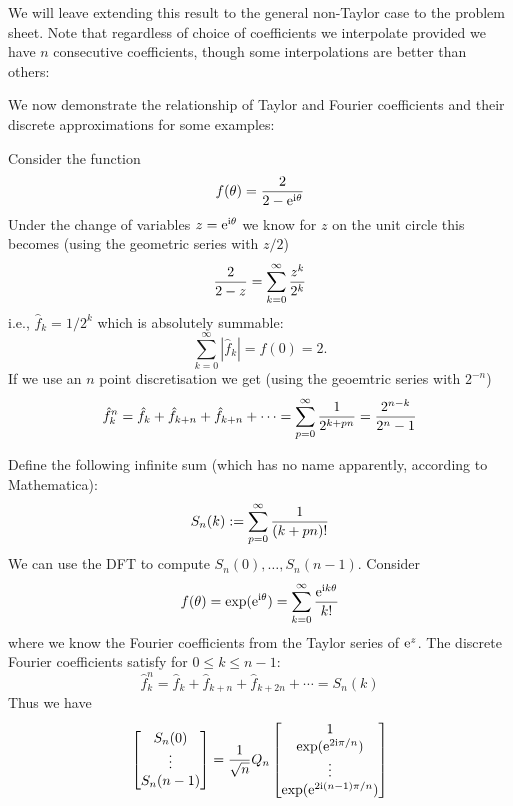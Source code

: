 We will leave extending this result to the general non-Taylor case to the problem sheet. Note that regardless of choice of coefficients we interpolate provided we have $n$ consecutive coefficients, though some interpolations are better than others:

We now demonstrate the relationship of Taylor and Fourier coefficients and their discrete approximations for some examples:

\begin{example} Consider the function
\[
f(\ensuremath{\theta}) = {2 \over 2 - {\rm e}^{{\rm i} \ensuremath{\theta}}}
\]
Under the change of variables $z = {\rm e}^{{\rm i} \ensuremath{\theta}}$ we know for $z$ on the unit circle this becomes (using the geometric series with $z/2$)
\[
{2 \over 2-z} = \ensuremath{\sum}_{k=0}^\ensuremath{\infty} {z^k \over 2^k}
\]
i.e., $\hat f_k = 1/2^k$ which is absolutely summable:
\[
\ensuremath{\sum}_{k=0}^\ensuremath{\infty} |\hat f_k| = f(0) = 2.
\]
If we use an $n$ point discretisation we get (using the geoemtric series with $2^{-n}$)
\[
\hat f_k^n = \hat f_k + \hat f_{k+n} + \hat f_{k+n} + \ensuremath{\cdots} = \ensuremath{\sum}_{p=0}^\ensuremath{\infty} {1 \over 2^{k+pn}} = {2^{n-k} \over 2^n - 1}
\]
\end{example}

\begin{example} Define the following infinite sum (which has no name apparently, according to Mathematica):
\[
S_n(k) := \ensuremath{\sum}_{p=0}^\ensuremath{\infty} {1 \over (k+pn)!}
\]
We can use the DFT to compute $S_n(0), \ensuremath{\ldots}, S_n(n-1)$. Consider
\[
f(\ensuremath{\theta}) = \exp({\rm e}^{{\rm i} \ensuremath{\theta}}) = \ensuremath{\sum}_{k=0}^\ensuremath{\infty} {{\rm e}^{{\rm i} k \ensuremath{\theta}} \over k!}
\]
where we know the Fourier coefficients from the Taylor series of ${\rm e}^z$. The discrete Fourier coefficients satisfy for $0 \ensuremath{\leq} k \ensuremath{\leq} n-1$:
\[
\hat f_k^n = \hat f_k + \hat f_{k+n} + \hat f_{k+2n} + \ensuremath{\cdots} = S_n(k)
\]
Thus we have
\[
\begin{bmatrix}
S_n(0) \\
\ensuremath{\vdots} \\
S_n(n-1)
\end{bmatrix} = {1 \over \sqrt{n}} Q_n \begin{bmatrix} 1 \\
                                \exp({\rm e}^{2{\rm i} \ensuremath{\pi}/n}) \\
                                \ensuremath{\vdots} \\
                                \exp({\rm e}^{2{\rm i} (n-1) \ensuremath{\pi}/n}) \end{bmatrix}
\]
\end{example}



